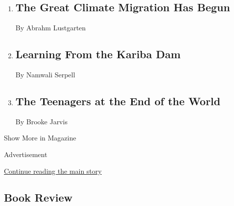 \begin{enumerate}
\def\labelenumi{\arabic{enumi}.}
\item
  \href{/interactive/2020/07/23/magazine/climate-migration.html}{}

  \hypertarget{the-great-climate-migration-has-begun-1}{%
  \subsection{The Great Climate Migration Has
  Begun}\label{the-great-climate-migration-has-begun-1}}

  By Abrahm Lustgarten
\item
  \href{/interactive/2020/07/22/magazine/zambia-kariba-dam.html}{}

  \hypertarget{learning-from-the-kariba-dam}{%
  \subsection{Learning From the Kariba
  Dam}\label{learning-from-the-kariba-dam}}

  By Namwali Serpell
\item
  \href{/interactive/2020/07/21/magazine/teenage-activist-climate-change.html}{}

  \hypertarget{the-teenagers-at-the-end-of-the-world}{%
  \subsection{The Teenagers at the End of the
  World}\label{the-teenagers-at-the-end-of-the-world}}

  By Brooke Jarvis
\end{enumerate}

Show More in Magazine

Advertisement

\protect\hyperlink{after-mid6}{Continue reading the main story}

\hypertarget{book-review}{%
\subsection{Book Review}\label{book-review}}

